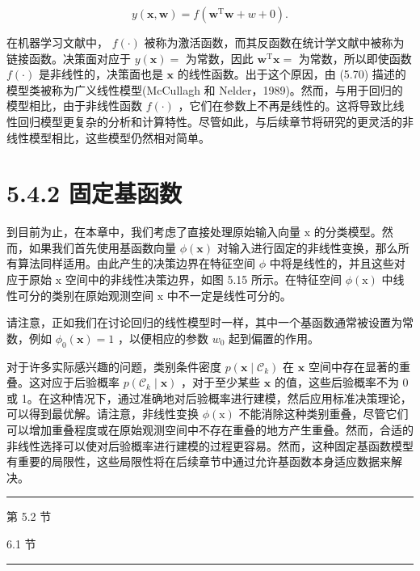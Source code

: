 \documentclass[10pt]{article}
\newcommand{\HRule}{\begin{center}\rule{0.9\linewidth}{0.2mm}\end{center}}
\begin{document}
\[
y\left( {\mathbf{x},\mathbf{w}}\right)  = f\left( {{\mathbf{w}}^{\mathrm{T}}\mathbf{w} + w + 0}\right) . \tag{5.70}
\]

在机器学习文献中， \(f\left( \cdot \right)\) 被称为激活函数，而其反函数在统计学文献中被称为链接函数。决策面对应于 \(y\left( \mathbf{x}\right)  =\) 为常数，因此 \({\mathbf{w}}^{\mathrm{T}}\mathbf{x} =\) 为常数，所以即使函数 \(f\left( \cdot \right)\) 是非线性的，决策面也是 \(\mathbf{x}\) 的线性函数。出于这个原因，由 (5.70) 描述的模型类被称为广义线性模型(McCullagh 和 Nelder，1989)。然而，与用于回归的模型相比，由于非线性函数 \(f\left( \cdot \right)\) ，它们在参数上不再是线性的。这将导致比线性回归模型更复杂的分析和计算特性。尽管如此，与后续章节将研究的更灵活的非线性模型相比，这些模型仍然相对简单。

\section*{5.4.2 固定基函数}

到目前为止，在本章中，我们考虑了直接处理原始输入向量 \(\mathrm{x}\) 的分类模型。然而，如果我们首先使用基函数向量 \(\phi \left( \mathbf{x}\right)\) 对输入进行固定的非线性变换，那么所有算法同样适用。由此产生的决策边界在特征空间 \(\phi\) 中将是线性的，并且这些对应于原始 \(\mathrm{x}\) 空间中的非线性决策边界，如图 5.15 所示。在特征空间 \(\phi \left( \mathrm{x}\right)\) 中线性可分的类别在原始观测空间 \(\mathrm{x}\) 中不一定是线性可分的。

请注意，正如我们在讨论回归的线性模型时一样，其中一个基函数通常被设置为常数，例如 \({\phi }_{0}\left( \mathbf{x}\right)  = 1\) ，以便相应的参数 \({w}_{0}\) 起到偏置的作用。

对于许多实际感兴趣的问题，类别条件密度 \(p\left( {\mathbf{x} \mid  {\mathcal{C}}_{k}}\right)\) 在 \(\mathbf{x}\) 空间中存在显著的重叠。这对应于后验概率 \(p\left( {{\mathcal{C}}_{k} \mid  \mathbf{x}}\right)\) ，对于至少某些 \(\mathbf{x}\) 的值，这些后验概率不为 0 或 1。在这种情况下，通过准确地对后验概率进行建模，然后应用标准决策理论，可以得到最优解。请注意，非线性变换 \(\phi \left( \mathrm{x}\right)\) 不能消除这种类别重叠，尽管它们可以增加重叠程度或在原始观测空间中不存在重叠的地方产生重叠。然而，合适的非线性选择可以使对后验概率进行建模的过程更容易。然而，这种固定基函数模型有重要的局限性，这些局限性将在后续章节中通过允许基函数本身适应数据来解决。

\HRule

第 5.2 节

6.1 节

\HRule
\end{document}
